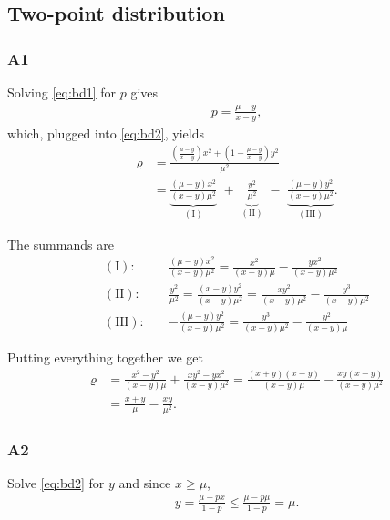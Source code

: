 \subsection{Two-point distribution}

\subsubsection*{A1}

Solving \eqref{eq:bd1} for $p$ gives
\begin{align}
  p = \frac{\mu-y}{x-y},
\end{align}
%
which, plugged into \eqref{eq:bd2}, yields
\begin{align}
  \varrho & = \frac{\left(\frac{\mu-y}{x-y}\right)x^2  + \left(1-\frac{\mu-y}{x-y}\right) y^2}{\mu^2} \\ & = \underbrace{\frac{(\mu - y)x^2}{(x-y)\mu^2}}_{\mathrm{(I)}}\,\, + \,\, \underbrace{\frac{y^2}{\mu^2}}_{\mathrm{(II)}}\,\, - \,\, \underbrace{\frac{(\mu - y)y^2}{(x-y) \mu^2}}_{\mathrm{(III)}}.
\end{align}

The summands are
\begin{align}
  \mathrm{(I):} \quad & \frac{(\mu - y)x^2}{(x-y)\mu^2} = \frac{x^2}{(x-y)\mu} - \frac{yx^2}{(x-y)\mu^2} \\
  \mathrm{(II):} \quad &  \frac{y^2}{\mu^2} = \frac{(x-y)y^2}{(x-y)\mu^2} = \frac{xy^2}{(x-y)\mu^2} - \frac{y^3}{(x-y)\mu^2} \\
  \mathrm{(III):} \quad & - \frac{(\mu - y)y^2}{(x-y) \mu^2} = \frac{y^3}{(x-y)\mu^2} - \frac{y^2}{(x-y)\mu}
\end{align}

Putting everything together we get
\begin{align}
  \varrho & =  \frac{x^2 - y^2}{(x-y)\mu} + \frac{xy^2 -yx^2}{(x-y)\mu^2}  = \frac{(x + y) (x-y)}{(x-y)\mu} - \frac{xy (x-y)}{(x-y)\mu^2} \\
  & = \frac{x+y}{\mu} - \frac{xy}{\mu^2}.
\end{align}

\subsubsection*{A2}
Solve \eqref{eq:bd2} for $y$ and since $x \geq \mu$,
\begin{align}
y = \frac{\mu - px}{1-p} \leq \frac{\mu - p\mu}{1-p} = \mu.
\end{align}


